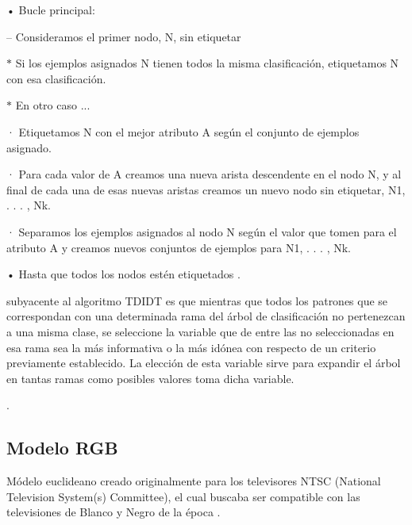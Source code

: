 \documentclass[10pt]{article}
\begin{document}
\setlength{\parskip}{2mm}

• Bucle principal:

\setlength{\parskip}{2mm}

– Consideramos el primer nodo, N, sin etiquetar
\setlength{\parskip}{2mm}

$\ast$ Si los ejemplos asignados N tienen todos la misma clasificación,  etiquetamos N con esa clasificación.

\setlength{\parskip}{2mm}

$\ast$ En otro caso ...

\setlength{\parskip}{2mm}

· Etiquetamos N con el mejor atributo A según el conjunto de
ejemplos asignado.
\setlength{\parskip}{2mm}

· Para cada valor de A creamos una nueva arista descendente en el nodo N, y al final de cada una de esas nuevas aristas creamos un nuevo nodo sin etiquetar, N1, . . . , Nk.

\setlength{\parskip}{2mm}

· Separamos los ejemplos asignados al nodo N según el valor que tomen para el atributo A y creamos nuevos conjuntos de ejemplos para N1, . . . , Nk.

\setlength{\parskip}{2mm}

• Hasta que todos los nodos estén etiquetados \cite{IEEEreferencias:Ref15}.

subyacente al algoritmo TDIDT es que mientras que todos los patrones que se correspondan con una determinada rama del árbol de clasificación no pertenezcan a una misma clase, se seleccione la variable que de entre las no seleccionadas en esa rama sea la más informativa o la más idónea con respecto de un criterio previamente establecido. La elección de esta variable sirve para expandir el árbol en tantas ramas como posibles valores toma dicha variable.

\cite{IEEEreferencias:Ref15}.

\subsection{Modelo RGB}

Módelo euclideano creado originalmente para los televisores NTSC (National Television System(s) Committee), el cual buscaba ser compatible con las televisiones de Blanco y Negro de la época \cite{IEEEreferencias:Ref16}.
\end{document}
